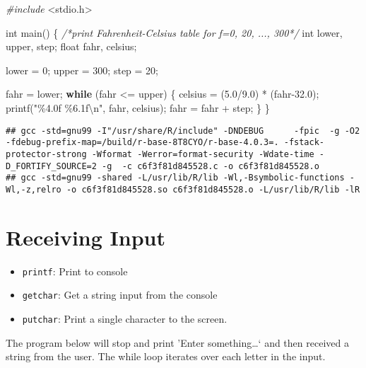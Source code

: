 \documentclass[
]{book}
\newenvironment{Shaded}{\begin{snugshade}}{\end{snugshade}}
\newcommand{\CommentTok}[1]{\textcolor[rgb]{0.56,0.35,0.01}{\textit{#1}}}
\newcommand{\ControlFlowTok}[1]{\textcolor[rgb]{0.13,0.29,0.53}{\textbf{#1}}}
\newcommand{\DataTypeTok}[1]{\textcolor[rgb]{0.13,0.29,0.53}{#1}}
\newcommand{\DecValTok}[1]{\textcolor[rgb]{0.00,0.00,0.81}{#1}}
\newcommand{\FloatTok}[1]{\textcolor[rgb]{0.00,0.00,0.81}{#1}}
\newcommand{\ImportTok}[1]{#1}
\newcommand{\NormalTok}[1]{#1}
\newcommand{\PreprocessorTok}[1]{\textcolor[rgb]{0.56,0.35,0.01}{\textit{#1}}}
\newcommand{\SpecialCharTok}[1]{\textcolor[rgb]{0.00,0.00,0.00}{#1}}
\newcommand{\StringTok}[1]{\textcolor[rgb]{0.31,0.60,0.02}{#1}}
\providecommand{\tightlist}{%
  \setlength{\itemsep}{0pt}\setlength{\parskip}{0pt}}
\begin{document}
\begin{Shaded}
\begin{Highlighting}[]
\PreprocessorTok{\#include }\ImportTok{\textless{}stdio.h\textgreater{}}

\DataTypeTok{int}\NormalTok{ main() \{}
    \CommentTok{/*print Fahrenheit{-}Celsius table for f=0, 20, ..., 300*/}
    \DataTypeTok{int}\NormalTok{ lower, upper, step;}
    \DataTypeTok{float}\NormalTok{ fahr, celsius;}

\NormalTok{    lower = }\DecValTok{0}\NormalTok{;}
\NormalTok{    upper = }\DecValTok{300}\NormalTok{;}
\NormalTok{    step = }\DecValTok{20}\NormalTok{;}

\NormalTok{    fahr = lower;}
    \ControlFlowTok{while}\NormalTok{ (fahr \textless{}= upper) \{}
\NormalTok{        celsius = (}\FloatTok{5.0}\NormalTok{/}\FloatTok{9.0}\NormalTok{) * (fahr{-}}\FloatTok{32.0}\NormalTok{);}
\NormalTok{        printf(}\StringTok{"\%4.0f \%6.1f}\SpecialCharTok{\textbackslash{}n}\StringTok{"}\NormalTok{, fahr, celsius);}
\NormalTok{        fahr = fahr + step;}
\NormalTok{    \}}
\NormalTok{\}}
\end{Highlighting}
\end{Shaded}

\begin{verbatim}
## gcc -std=gnu99 -I"/usr/share/R/include" -DNDEBUG      -fpic  -g -O2 -fdebug-prefix-map=/build/r-base-8T8CYO/r-base-4.0.3=. -fstack-protector-strong -Wformat -Werror=format-security -Wdate-time -D_FORTIFY_SOURCE=2 -g  -c c6f3f81d845528.c -o c6f3f81d845528.o
## gcc -std=gnu99 -shared -L/usr/lib/R/lib -Wl,-Bsymbolic-functions -Wl,-z,relro -o c6f3f81d845528.so c6f3f81d845528.o -L/usr/lib/R/lib -lR
\end{verbatim}

\hypertarget{receiving-input}{%
\section{Receiving Input}\label{receiving-input}}

\begin{itemize}
\tightlist
\item
  \texttt{printf}: Print to console
\item
  \texttt{getchar}: Get a string input from the console
\item
  \texttt{putchar}: Print a single character to the screen.
\end{itemize}

The program below will stop and print 'Enter something\ldots` and then received a string from the user. The while loop iterates over each letter in the input.
\end{document}
